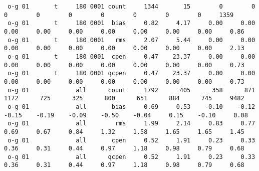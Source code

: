 \begin{itemize}[leftmargin=*]
\begin{tiny}
\begin{verbatim}
 o-g 01       t     180 0001 count     1344       15        0        0        0        0        0        0        0        0        0     1359
 o-g 01       t     180 0001  bias     0.82     4.17     0.00     0.00     0.00     0.00     0.00     0.00     0.00     0.00     0.00     0.86
 o-g 01       t     180 0001   rms     2.07     5.44     0.00     0.00     0.00     0.00     0.00     0.00     0.00     0.00     0.00     2.13
 o-g 01       t     180 0001  cpen     0.47    23.37     0.00     0.00     0.00     0.00     0.00     0.00     0.00     0.00     0.00     0.73
 o-g 01       t     180 0001 qcpen     0.47    23.37     0.00     0.00     0.00     0.00     0.00     0.00     0.00     0.00     0.00     0.73
 o-g 01             all      count     1792      405      358      871     1172      725      325      800      651      884      745     9482
 o-g 01             all       bias     0.69     0.53    -0.10    -0.12    -0.15    -0.19    -0.09    -0.50    -0.04     0.15    -0.10     0.08
 o-g 01             all        rms     1.99     2.14     0.83     0.77     0.69     0.67     0.84     1.32     1.58     1.65     1.65     1.45
 o-g 01             all       cpen     0.52     1.91     0.23     0.33     0.36     0.31     0.44     0.97     1.18     0.98     0.79     0.68
 o-g 01             all      qcpen     0.52     1.91     0.23     0.33     0.36     0.31     0.44     0.97     1.18     0.98     0.79     0.68




\end{verbatim}
\end{tiny}
\end{itemize}
